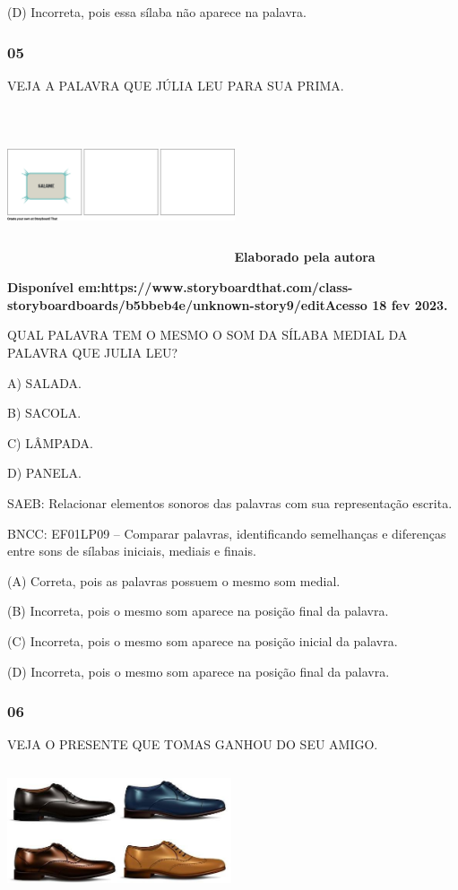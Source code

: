 (D) Incorreta, pois essa sílaba não aparece na palavra.

\subsubsection{05}\label{section-30}

VEJA A PALAVRA QUE JÚLIA LEU PARA SUA PRIMA.

\includegraphics[width=2.64104in,height=1.80504in]{media/image190.png}\textbf{Elaborado
pela autora}

\textbf{Disponível
em:https://www.storyboardthat.com/class-storyboardboards/b5bbeb4e/unknown-story9/editAcesso
18 fev 2023.}

QUAL PALAVRA TEM O MESMO O SOM DA SÍLABA MEDIAL DA PALAVRA QUE JULIA LEU?

A) SALADA.

B) SACOLA.

C) LÂMPADA.

D) PANELA.

SAEB: Relacionar elementos sonoros das palavras com sua
representação escrita.

BNCC: EF01LP09 -- Comparar palavras, identificando semelhanças e
diferenças entre sons de sílabas iniciais, mediais e finais.

(A) Correta, pois as palavras possuem o mesmo som medial.

(B) Incorreta, pois o mesmo som aparece na posição final da palavra.

(C) Incorreta, pois o mesmo som aparece na posição inicial da palavra.

(D) Incorreta, pois o mesmo som aparece na posição final da palavra.

\subsubsection{06}\label{section-31}

VEJA O PRESENTE QUE TOMAS GANHOU DO SEU AMIGO.

\includegraphics[width=2.60694in,height=1.48889in]{media/image191.jpg}

